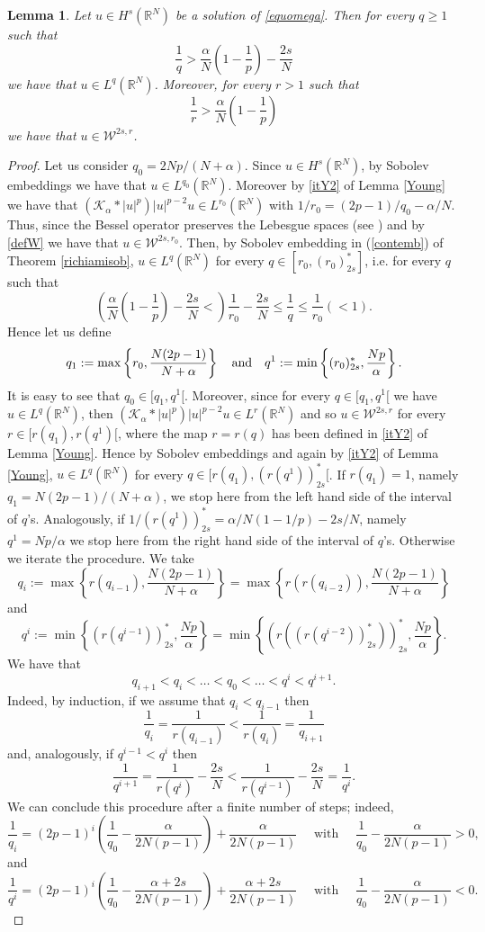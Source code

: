 \documentclass[10pt]{amsart}
\numberwithin{equation}{section}
\newtheorem{lemma}[theorem]{Lemma}
\begin{document}
\begin{lemma}
\label{LqWr}
Let $u\in H^s(\mathbb{R}^N)$ be a solution of \eqref{equomega}. Then for every $q\geq 1$ such that
\[
\frac{1}{q}>\frac{\alpha}{N}\left(1-\frac{1}{p}\right)-\frac{2s}{N}
\] 
we have that $u\in L^q (\mathbb{R}^N)$. Moreover,  for every $r>1$ such that
\[
\frac{1}{r}>\frac{\alpha}{N}\left(1-\frac{1}{p}\right)
\]
we have that $u \in \mathcal{W}^{2s,r}$.
\end{lemma}
\begin{proof}
Let us consider $q_0=2Np/(N+\alpha)$. Since $u\in H^s(\mathbb{R}^N)$, by Sobolev  embeddings we have that $u\in L^{q_0} (\mathbb{R}^N)$. Moreover by \eqref{itY2} of
 Lemma \ref{Young} we have that $(\mathcal{K}_{\alpha} * |u|^p)|u|^{p-2}u \in L^{r_0}(\mathbb{R}^N)$ with $1/r_0=(2p-1)/q_0-\alpha/N$. 
 Thus, since the Bessel operator preserves the Lebesgue spaces (see \cite{Stein}) and by \eqref{defW} we have that $u\in\mathcal{W}^{2s,r_0}$. Then, by Sobolev embedding in (\ref{contemb}) of Theorem \ref{richiamisob}, $u\in L^{q}(\mathbb{R}^N)$ for every $q\in[r_0,(r_0)^*_{2s}]$, i.e. for every $q$ such that
\[
\left(\frac{\alpha}{N}\left(1-\frac{1}{p}\right)-\frac{2s}{N}<\right)\frac{1}{r_0}-\frac{2s}{N} \leq \frac{1}{q} \leq \frac{1}{r_0}(<1).
\]
Hence let us define
\[
q_1:=\max\left\{r_0,\frac{N(2p-1)}{N+\alpha}\right\}
\quad
\hbox{and}
\quad
q^1:=\min\left\{ (r_0)^*_{2s}, \frac{Np}{\alpha}\right\}.
\]
It is easy to see that $q_0\in[q_1,q^1[$. Moreover, since for every $q\in [q_1,q^1[$ we have $u\in L^{q}(\mathbb{R}^N)$, then $(\mathcal{K}_{\alpha} * |u|^p)|u|^{p-2}u \in L^{r}(\mathbb{R}^N)$ and so $u\in\mathcal{W}^{2s,r}$ for every $r\in[r(q_1),r(q^1)[$,
where the map $r=r(q)$   has been defined in  \eqref{itY2} of Lemma \ref{Young}.
Hence by Sobolev embeddings and again by \eqref{itY2} of Lemma \ref{Young}, $u\in L^{q}(\mathbb{R}^N)$ for every $q\in[r(q_1),(r(q^1))^*_{2s}[$. If $r(q_1)=1$, namely $q_1=N(2p-1)/(N+\alpha)$, we stop here from the left hand side of the interval of $q$'s. Analogously, if $1/(r(q^1))^*_{2s}=\alpha/N(1-1/p)-2s/N$, namely $q^1=Np/\alpha$ we stop here from the right hand side of the interval of $q$'s. Otherwise we iterate the procedure. We take
\[
q_i:=\max\left\{r(q_{i-1}),\frac{N(2p-1)}{N+\alpha}\right\}=\max\left\{r(r(q_{i-2})),\frac{N(2p-1)}{N+\alpha}\right\}
\]
and
\[
q^i:=\min\left\{ (r(q^{i-1}))^*_{2s}, \frac{Np}{\alpha}\right\}=\min\left\{ (r((r(q^{i-2}))^*_{2s}))^*_{2s}, \frac{Np}{\alpha}\right\}.
\]
We have that 
\[
q_{i+1}<q_{i}<\ldots<q_0<\ldots<q^i<q^{i+1}.
\]
Indeed, by induction, if we assume that $q_i < q_{i-1}$ then
\[
\frac{1}{q_i}=\frac{1}{r(q_{i-1})}<\frac{1}{r(q_{i})}=\frac{1}{q_{i+1}}
\]
and, analogously, if $q^{i-1}<q^{i}$ then
\[
\frac{1}{q^{i+1}}=\frac{1}{r(q^{i})}-\frac{2s}{N}<\frac{1}{r(q^{i-1})}-\frac{2s}{N}=\frac{1}{q^{i}}.
\]
We can conclude this procedure after a finite number of steps; indeed,
\[
\frac{1}{q_i}=(2p-1)^i\left(\frac{1}{q_0}-\frac{\alpha}{2N(p-1)}\right) + \frac{\alpha}{2N(p-1)}
\quad \text{ with } \quad \frac{1}{q_0}-\frac{\alpha}{2N(p-1)}>0,
\]
and 
\[
\frac{1}{q^{i}}=(2p-1)^i\left(\frac{1}{q_0}-\frac{\alpha+2s}{2N(p-1)}\right) + \frac{\alpha+2s}{2N(p-1)}
\quad \text{ with } \quad \frac{1}{q_0}-\frac{\alpha}{2N(p-1)}<0.
\]
\end{proof}
\end{document}
